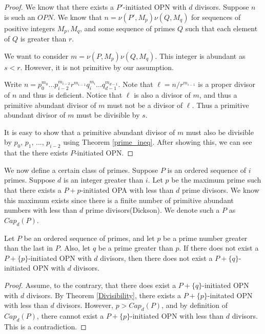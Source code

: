 \documentclass[../paper.tex]{subfiles}
\begin{document}
\begin{proof}
We know that there exists a $P'$-initiated OPN with $d$ divisors.
Suppose $n$ is such an $OPN$. We know that $n = \nu(P', M_p) 
\nu(Q, M_q)$ for sequences of positive integers $M_p, M_q$, and 
some sequence of primes $Q$ such that each element of $Q$ is 
greater than $r$.

  We want to consider $m = \nu(P, M_p) \nu(Q, M_q)$. This integer is
abundant as $s < r$. However, it is not primitive by our
assumption.

  Write $n = p_0^{m_0} ... p_{i-2}^{m_{i-2}} r^{m_{i-1}}
q_{i}^{m_i} ... q_{d-1}^{m_{d-1}}$. Note that $\ell = n / r^{m_{i-1}}$ is
a proper divisor of $n$ and thus is deficient. Notice that $\ell$
is also a divisor of $m$, and thus a primitive abundant divisor of
$m$ must not be a divisor of $\ell$. Thus a primitive abundant
divisor of $m$ must be divisible by $s$.

  It is easy to show that a primitive abundant divisor of $m$ must
also be divisible by $p_0$, $p_1$, ..., $p_{i-2}$ using Theorem
{\ref{prime_ineq}}. After showing this, we can see that the 
there exists $P$-initiated OPN.
\end{proof}


We now define a certain class of primes.
Suppose $P$ is an ordered sequence of $i$ primes. Suppose $d$ is
an integer greater than $i$. Let $p$ be the maximum prime such 
that there exists a $P + {p}$-initiated OPA with less than $d$ 
prime divisors\footnotemark. We know this maximum exists since 
there is a finite number of primitive abundant numbers with less
than $d$ prime divisors(Dickson). We denote such a $P$ as 
$Cap_d(P)$. 


\begin{theorem}
Let $P$ be an ordered sequence of primes, and let $p$ be a prime
number greater than the last in $P$. Also, let $q$ be a prime
greater than $p$. If there does not exist a $P + \{p\}$-initiated
OPN with $d$ divisors, then there does not exist a $P +
\{q\}$-initiated OPN with $d$ divisors.
\end{theorem}

\begin{proof}
Assume, to the contrary, that there does exist a $P + 
\{q\}$-initiated OPN with $d$ divisors. By Theorem {\ref{Divisibility}},
there exists a $P + \{p\}$-initated OPN with less than $d$
divisors. However, $p > Cap_d(P)$, and by definition of
$Cap_d(P)$, there cannot exist a $P + \{p\}$-initiated OPN with
less than $d$ divisors. This is a contradiction.
\end{proof}
\end{document}
